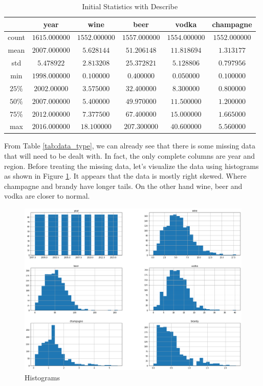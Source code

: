 \documentclass{article}
\begin{document}
\begin{table}[!htb]
    \centering
    \begin{tabular}{c|c|c|c|c|c}
    \hline
        & year & wine & beer& vodka & champagne\\\hline
        count & $1615.000000$ & $1552.000000$ & $1557.000000$ & $1554.000000$ & $1552.000000$ \\
        mean & $2007.000000$  & $5.628144$ & $51.206148$ & $11.818694$ & $1.313177$ \\
        std  & $5.478922$ & $2.813208$ & $25.372821$ & $5.128806$ & $0.797956$\\
        min  &  $1998.000000$ & $0.100000$ & $0.400000$ & $0.050000$ & $0.100000$\\
        $25\%$& $2002.00000$ & $3.575000$ & $32.400000$ & $8.300000$ & $0.800000$\\
        $50\%$& $2007.000000$ & $5.400000$ & $49.970000$ & $11.500000$ & $1.200000$\\
        $75\%$& $2012.000000$ & $7.377500$ & $67.400000$ & $15.000000$ & $1.665000$\\
        max  & $2016.000000$ & $18.100000$ & $207.300000$ & $40.600000$ & $5.560000$\\
        \hline
    \end{tabular}
    \caption{Initial Statistics with Describe}
    \label{tab:inital_stats}
\end{table}


\noindent From Table \ref{tab:data_type}, we can already see that there is some missing data that will need to be dealt with. In fact, the only complete columns are year and region. Before treating the missing data, let's visualize the data using histograms as shown in Figure \ref{fig:Histograms}. It appears that the data is mostly right skewed. Where champagne and brandy have longer tails. On the other hand wine, beer and vodka are closer to normal. 

\begin{figure}[!htb]
    \centering
    \includegraphics[scale = .42]{output_4_1.png}
    \caption{Histograms}
    \label{fig:Histograms}
\end{figure}
\end{document}
